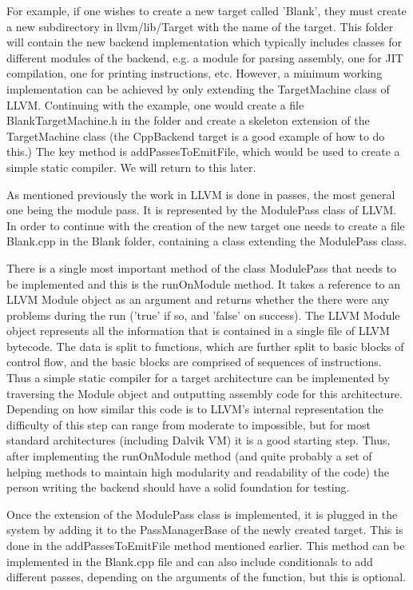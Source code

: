 \documentclass[parskip]{cs4rep}
\begin{document}
For example, if one wishes to create a new target called 'Blank', they must create a new subdirectory in llvm/lib/Target with the name of the target. This folder will contain the new backend implementation which typically includes classes for different modules of the backend, e.g. a module for parsing assembly, one for JIT compilation, one for printing instructions, etc. However, a minimum working implementation can be achieved by only extending the TargetMachine class of LLVM. Continuing with the example, one would create a file BlankTargetMachine.h in the folder and create a skeleton extension of the TargetMachine class (the CppBackend target is a good example of how to do this.) The key method is addPassesToEmitFile, which would be used to create a simple static compiler. We will return to this later.

As mentioned previously the work in LLVM is done in passes, the most general one being the module pass. It is represented by the ModulePass class of LLVM. In order to continue with the creation of the new target one needs to create a file Blank.cpp in the Blank folder, containing a class extending the ModulePass class.

There is a single most important method of the class ModulePass that needs to be implemented and this is the runOnModule method. It takes a reference to an LLVM Module object as an argument and returns whether the there were any problems during the run ('true' if so, and 'false' on success). The LLVM Module object represents all the information that is contained in a single file of LLVM bytecode. The data is split to functions, which are further split to basic blocks of control flow, and the basic blocks are comprised of sequences of instructions. Thus a simple static compiler for a target architecture  can be implemented by traversing the Module object and outputting assembly code for this architecture. Depending on how similar this code is to LLVM's internal representation the difficulty of this step can range from moderate to impossible, but for most standard architectures (including Dalvik VM) it is a good starting step. Thus, after implementing the runOnModule method (and quite probably a set of helping methods to maintain high modularity and readability of the code) the person writing the backend should have a solid foundation for testing.

Once the extension of the ModulePass class is implemented, it is plugged in the system by adding it to the PassManagerBase of the newly created target. This is done in the addPassesToEmitFile method mentioned earlier. This method can be implemented in the Blank.cpp file and can also include conditionals to add different passes, depending on the arguments of the function, but this is optional.
\end{document}

